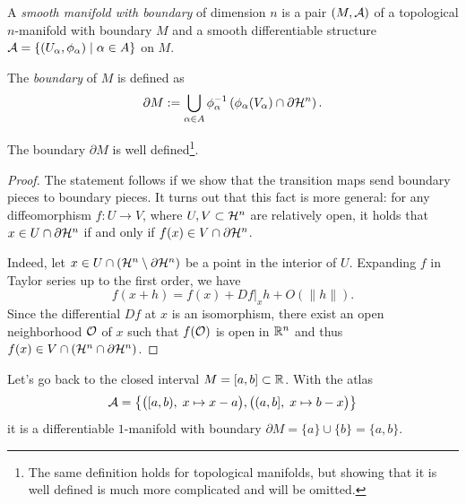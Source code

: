 \begin{definition}\label{def:diffmanifoldwb}
  A \emph{smooth manifold with boundary} of dimension $n$ is a pair $(M, \mathcal{A})$ of a topological $n$-manifold with boundary $M$ and a smooth differentiable structure $\mathcal{A} = \{(U_\alpha, \phi_\alpha) \mid \alpha\in A\}$ on $M$.
  
  The \emph{boundary} of $M$ is defined as
  \begin{equation}\label{def:bdry}
    \partial M := \bigcup_{\alpha\in A} \phi_\alpha^{-1}\left(\phi_\alpha(V_\alpha)\cap \partial\mathcal{H}^n\right).
  \end{equation}
\end{definition}

\begin{proposition}\label{prop:bdwelldef}
  The boundary $\partial M$ is well defined\footnote{The same definition holds for topological manifolds, but showing that it is well defined is much more complicated and will be omitted.}.
\end{proposition}
\begin{proof}
  The statement follows if we show that the transition maps send boundary pieces to boundary pieces.
  It turns out that this fact is more general: for any diffeomorphism $f:U \to V$, where $U,V \subset\mathcal{H}^n$ are relatively open, it holds that $x\in U\cap\partial\mathcal{H}^n$ if and only if $f(x)\in V\cap\partial\mathcal{H}^n$.

  Indeed, let $x\in U\cap(\mathcal{H}^n\setminus\partial\mathcal{H}^n)$ be a point in the interior of $U$. Expanding $f$ in Taylor series up to the first order, we have
  \begin{equation}
    f(x+h) = f(x) + Df|_x h + O(\|h\|).
  \end{equation}
  Since the differential $D f$ at $x$ is an isomorphism, there exist an open neighborhood $\mathcal{O}$ of $x$ such that $f(\mathcal{O})$ is open in $\mathbb{R}^n$ and thus $f(x)\in V\cap(\mathcal{H}^n\cap\partial\mathcal{H}^n)$.
\end{proof}

\begin{example}
  Let's go back to the closed interval $M=[a,b]\subset\mathbb{R}$. 
  With the atlas
  \begin{equation}
    \mathcal{A}=\big\{
      \big([a,b), \; x\mapsto x-a\big),
      \big((a,b], \; x\mapsto b-x\big)
    \big\}
  \end{equation}
  it is a differentiable $1$-manifold with boundary $\partial M = \{a\} \cup \{b\} = \{a, b\}$.
\end{example}

